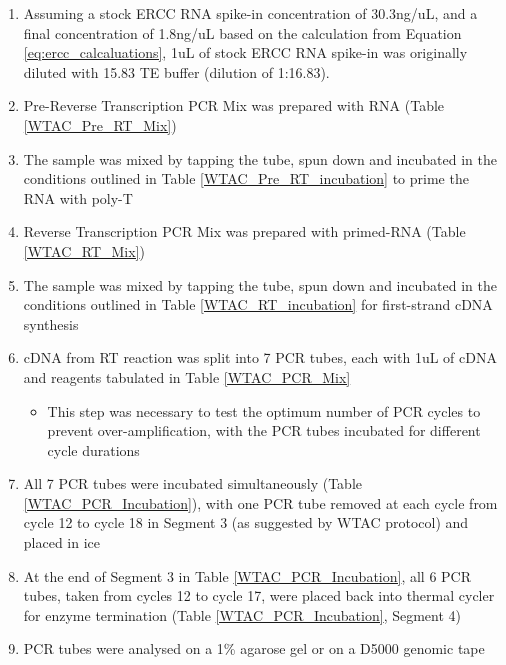\begin{enumerate}
	\item Assuming a stock ERCC RNA spike-in concentration of 30.3ng/uL, and a final concentration of 1.8ng/uL based on the calculation from Equation \ref{eq:ercc_calcaluations}, 1uL of stock ERCC RNA spike-in was originally diluted with 15.83 TE buffer (dilution of 1:16.83). 
	\item Pre-Reverse Transcription PCR Mix was prepared with RNA (Table \ref{WTAC_Pre_RT_Mix})
	\item The sample was mixed by tapping the tube, spun down and incubated in the conditions outlined in Table \ref{WTAC_Pre_RT_incubation} to prime the RNA with poly-T
	\item Reverse Transcription PCR Mix was prepared with primed-RNA (Table \ref{WTAC_RT_Mix})
	\item The sample was mixed by tapping the tube, spun down and incubated in the conditions outlined in Table \ref{WTAC_RT_incubation} for first-strand cDNA synthesis
	\item cDNA from RT reaction was split into 7 PCR tubes, each with 1uL of cDNA and reagents tabulated in Table \ref{WTAC_PCR_Mix}
		\begin{itemize}
			\item This step was necessary to test the optimum number of PCR cycles to prevent over-amplification, with the PCR tubes incubated for different cycle durations
		\end{itemize}
	\item All 7 PCR tubes were incubated simultaneously (Table \ref{WTAC_PCR_Incubation}), with one PCR tube removed at each cycle from cycle 12 to cycle 18 in Segment 3 (as suggested by WTAC protocol) and placed in ice
	\item At the end of Segment 3 in Table \ref{WTAC_PCR_Incubation}, all 6 PCR tubes, taken from cycles 12 to cycle 17, were placed back into thermal cycler for enzyme termination (Table \ref{WTAC_PCR_Incubation}, Segment 4) 
	\item PCR tubes were analysed on a 1\% agarose gel or on a D5000 genomic tape	
\end{enumerate}
\

